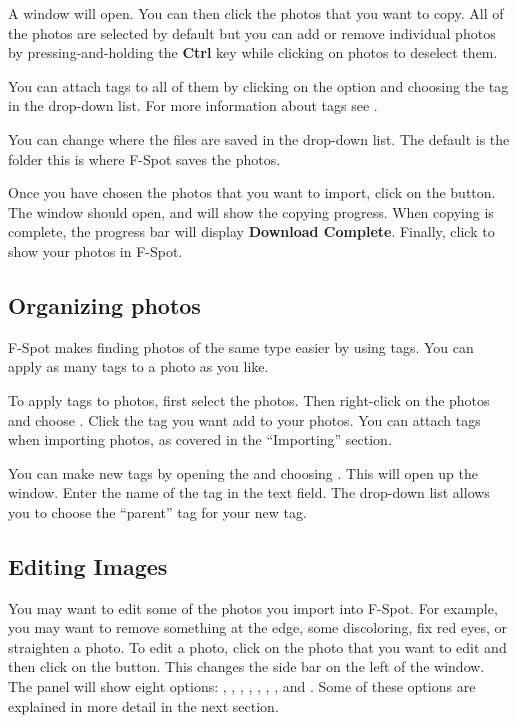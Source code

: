 A  window will open. You can then 
click the photos that you want to copy. All of the photos are selected by default 
but you can add or remove individual photos by pressing-and-holding 
the \textbf{Ctrl} key while clicking on photos to deselect them. 

You can attach tags to all of them by clicking on the  option
and choosing the tag in the  drop-down list. For more 
information about tags see .

You can change where the files are saved in the  
drop-down list. The default is the  folder \dash this is where 
F-Spot saves the photos.

Once you have chosen the photos that you want to import, click on the 
 button. The  window should open, 
and will show the copying progress. When copying is complete, the progress bar 
will display \textbf{Download Complete}. Finally, click  to show 
your photos in F-Spot.

\subsection{Organizing photos}
\label{sec:organizing-photos}

F-Spot makes finding photos of the same type easier by using tags. You can apply 
as many tags to a photo as you like. 

To apply tags to photos, first select the photos. Then right-click on the photos
and choose . Click the tag you want add to your photos. You can 
attach tags when importing photos, as covered in the ``Importing'' section.

You can make new tags by opening the  and choosing 
. This will open up the  window.
Enter the name of the tag in the  text field. The 
 drop-down list allows you to choose the ``parent'' tag 
for your new tag.

\subsection{Editing Images}

You may want to edit some of the photos you import into F-Spot. For example, 
you may want to remove something at the edge, some discoloring, fix red eyes, 
or straighten a photo. To edit a photo, click on the photo that you 
want to edit and then click on the  button. This changes the 
side bar on the left of the  window. The panel will show eight 
options: , , , 
, , , 
, and . Some of these options are 
explained in more detail in the next section.

